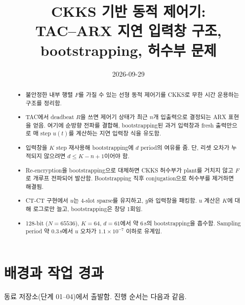 \documentclass[11pt,a4paper]{article}
\title{CKKS 기반 동적 제어기:\\ TAC--ARX 지연 입력창 구조, bootstrapping, 허수부 문제}
\author{}
\date{2026-09-29}
\begin{document}
\maketitle

\begin{abstract}
\begin{itemize}
\item 불안정한 내부 행렬 $F$를 가질 수 있는 선형 동적 제어기를 CKKS로 무한 시간 운용하는 구조를 정리함.
\item TAC에서 deadbeat $R$을 쓰면 제어기 상태가 최근 $n$개 입출력으로 결정되는 ARX 표현을 얻음.
      여기에 순방향 전파를 결합해, bootstrapping된 과거 입력창과 fresh 출력만으로 매 step $u(t)$를 계산하는 지연 입력창 식을 유도함.
\item 입력창을 $K$ step 재사용해 bootstrapping에 $d$ period의 여유를 줌.
      단, 리셋 오차가 누적되지 않으려면 $d\le K-n+1$이어야 함.
\item Re-encryption을 bootstrapping으로 대체하면 CKKS 허수부가 plant를 거치지 않고 $F$로 개루프 전파되어 발산함.
      Bootstrapping 직후 conjugation으로 허수부를 제거하면 해결됨.
\item CT-CT 구현에서 $u$는 4-slot sparse를 유지하고, $y$와 입력창을 패킹함.
      $u$ 계산은 $K$에 대해 로그로만 늘고, bootstrapping은 창당 1회임.
\item 128-bit ($N=65536$), $K=64$, $d=61$에서 약 6\,s의 bootstrapping을 흡수함.
      Sampling period 약 0.3\,s에서 $u$ 오차가 $1.1\times10^{-7}$ 이하로 유계임.
\end{itemize}
\end{abstract}

\tableofcontents

\section{배경과 작업 경과}

동료 저장소(단계 01--04)에서 출발함. 진행 순서는 다음과 같음.
\end{document}
